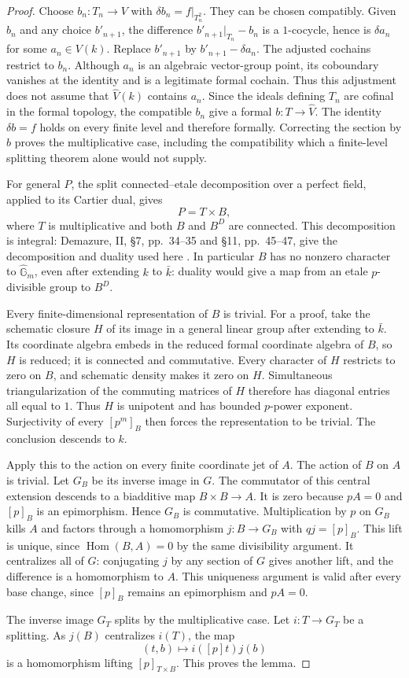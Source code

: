 \begin{proof}
Choose $b_n:T_n\to V$ with $\delta b_n=f|_{T_n^2}$.
They can be chosen compatibly.  Given $b_n$ and any choice
$b'_{n+1}$, the difference
$b'_{n+1}|_{T_n}-b_n$ is a $1$-cocycle, hence is $\delta a_n$ for
some $a_n\in V(k)$.  Replace $b'_{n+1}$ by
$b'_{n+1}-\delta a_n$.  The adjusted cochains restrict to $b_n$.
Although $a_n$ is an algebraic vector-group point, its coboundary
vanishes at the identity and is a legitimate formal cochain.  Thus
this adjustment does not assume that $\widehat V(k)$ contains
$a_n$.  Since the ideals defining $T_n$ are cofinal in the formal
topology, the compatible $b_n$ give a formal $b:T\to\widehat V$.
The identity $\delta b=f$ holds on every finite level and therefore
formally.  Correcting the section by $b$ proves the multiplicative
case, including the compatibility which a finite-level splitting
theorem alone would not supply.

For general $P$, the split connected--etale decomposition over a
perfect field, applied to its Cartier dual, gives
\[
 P=T\times B,
\]
where $T$ is multiplicative and both $B$ and $B^D$ are connected.
This decomposition is integral: Demazure, II, \S7, pp.~34--35 and
\S11, pp.~45--47, give the decomposition and duality used here
\cite{C4-Demazure1972}.  In particular $B$ has no nonzero character
to $\widehat{\mathbb G}_m$, even after extending $k$ to $\bar k$:
duality would give a map from an etale $p$-divisible group to $B^D$.

Every finite-dimensional representation of $B$ is trivial.  For a
proof, take the schematic closure $H$ of its image in a general linear
group after extending to $\bar k$.  Its coordinate algebra embeds in
the reduced formal coordinate algebra of $B$, so $H$ is reduced;
it is connected and commutative.  Every character of $H$ restricts
to zero on $B$, and schematic density makes it zero on $H$.
Simultaneous triangularization of the commuting matrices of $H$
therefore has diagonal entries all equal to $1$.  Thus $H$ is
unipotent and has bounded $p$-power exponent.  Surjectivity of every
$[p^m]_B$ then forces the representation to be trivial.  The conclusion
descends to $k$.

Apply this to the action on every finite coordinate jet of $A$.
The action of $B$ on $A$ is trivial.  Let $G_B$ be its inverse image
in $G$.  The commutator of this central extension descends to a
biadditive map $B\times B\to A$.  It is zero because $pA=0$ and
$[p]_B$ is an epimorphism.  Hence $G_B$ is commutative.  Multiplication
by $p$ on $G_B$ kills $A$ and factors through a homomorphism
$j:B\to G_B$ with $qj=[p]_B$.  This lift is unique, since
$\operatorname{Hom}(B,A)=0$ by the same divisibility argument.
It centralizes all of $G$: conjugating $j$ by any section of $G$
gives another lift, and the difference is a homomorphism to $A$.
This uniqueness argument is valid after every base change, since
$[p]_B$ remains an epimorphism and $pA=0$.

The inverse image $G_T$ splits by the multiplicative case.  Let
$i:T\to G_T$ be a splitting.  As $j(B)$ centralizes $i(T)$, the map
\[
 (t,b)\longmapsto i([p]t)j(b)
\]
is a homomorphism lifting $[p]_{T\times B}$.  This proves the lemma.
\end{proof}

